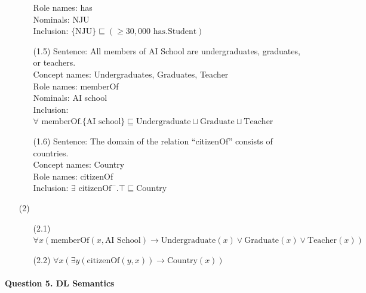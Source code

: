 \documentclass[12pt]{article}
\begin{document}
\begin{enumerate}
\begin{enumerate}
            Role names: has \\
            Nominals: NJU \\
            Inclusion: $\{ \text{NJU} \} \sqsubseteq (\ge 30,000 \text{ has}.\text{Student})$ \\
            \item[(1.5)]
            Sentence:  All members of AI School are undergraduates, graduates, or teachers. \\
            Concept names: Undergraduates, Graduates, Teacher \\
            Role names: memberOf \\
            Nominals: AI school \\
            Inclusion: $\forall \text{ memberOf}.\{ \text{AI school} \} \sqsubseteq \text{Undergraduate} \sqcup \text{Graduate} \sqcup \text{Teacher}$
            \item[(1.6)]
            Sentence:  The domain of the relation “citizenOf” consists of countries. \\
            Concept names: Country \\
            Role names: citizenOf \\
            Inclusion: $\exists \text{ citizenOf}^{-}.\top \sqsubseteq \text{Country}$ \\
        \end{enumerate}
        \item[(2)] 
        \begin{enumerate}
            \item[(2.1)]
            $\forall x(\text{memberOf}(x, \text{AI School}) \to \text{Undergraduate}(x) \lor \text{Graduate}(x) \lor \text{Teacher}(x))$
            \item[(2.2)] 
            $\forall x(\exists y(\text{citizenOf}(y, x)) \to \text{Country}(x))$
        \end{enumerate}
    \end{enumerate}

    \paragraph{Question 5. DL Semantics}~{}
    \\
\end{document}

